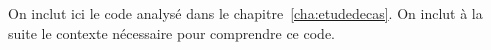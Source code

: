 On inclut ici le code analysé dans le chapitre~\ref{cha:etudedecas}. On inclut à
la suite le contexte nécessaire pour comprendre ce code.


{ \small
{}
}
